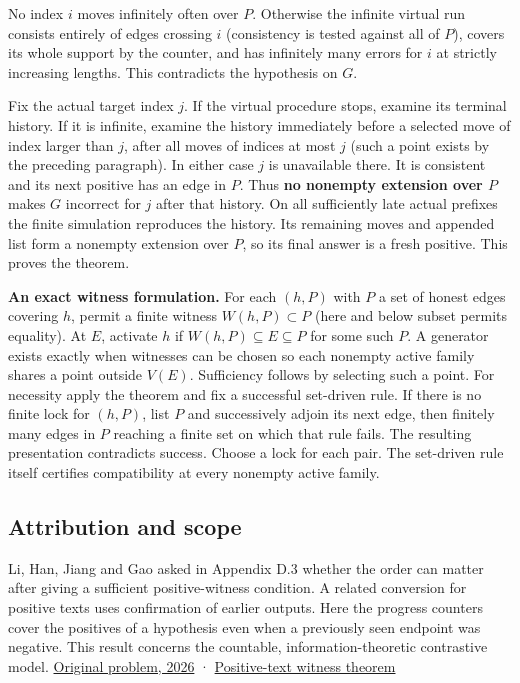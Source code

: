\documentclass[11pt]{article}
\begin{document}
No index \(i\) moves infinitely often over \(P\). Otherwise the infinite virtual run consists entirely of edges crossing \(i\) (consistency is tested against all of \(P\)), covers its whole support by the counter, and has infinitely many errors for \(i\) at strictly increasing lengths. This contradicts the hypothesis on \(G\).

Fix the actual target index \(j\). If the virtual procedure stops, examine its terminal history. If it is infinite, examine the history immediately before a selected move of index larger than \(j\), after all moves of indices at most \(j\) (such a point exists by the preceding paragraph). In either case \(j\) is unavailable there. It is consistent and its next positive has an edge in \(P\). Thus \textbf{no nonempty extension over \(P\)} makes \(G\) incorrect for \(j\) after that history. On all sufficiently late actual prefixes the finite simulation reproduces the history. Its remaining moves and appended list form a nonempty extension over \(P\), so its final answer is a fresh positive. This proves the theorem.

\textbf{An exact witness formulation.} For each \((h,P)\) with \(P\) a set of honest edges covering \(h\), permit a finite witness \(W(h,P)\subset P\) (here and below subset permits equality). At \(E\), activate \(h\) if \(W(h,P)\subseteq E\subseteq P\) for some such \(P\). A generator exists exactly when witnesses can be chosen so each nonempty active family shares a point outside \(V(E)\). Sufficiency follows by selecting such a point. For necessity apply the theorem and fix a successful set-driven rule. If there is no finite lock for \((h,P)\), list \(P\) and successively adjoin its next edge, then finitely many edges in \(P\) reaching a finite set on which that rule fails. The resulting presentation contradicts success. Choose a lock for each pair. The set-driven rule itself certifies compatibility at every nonempty active family.

\subsection{Attribution and scope}\label{attribution-and-scope}

Li, Han, Jiang and Gao asked in Appendix D.3 whether the order can matter after giving a sufficient positive-witness condition. A related conversion for positive texts uses confirmation of earlier outputs. Here the progress counters cover the positives of a hypothesis even when a previously seen endpoint was negative. This result concerns the countable, information-theoretic contrastive model. \href{https://arxiv.org/abs/2605.06211v2}{Original problem, 2026} · \href{https://arxiv.org/abs/2609.10525}{Positive-text witness theorem}
\end{document}
